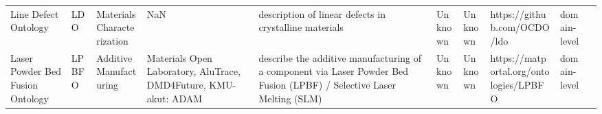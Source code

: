 \begin{tabular}{llllllllll}
                                                             Line Defect Ontology &                     LDO &                  Materials Characterization &                                                                                                                                                                                                                                                                                                                                                                  NaN &                                                                                                                                                                                                                                                                                                                                                 description of linear defects in crystalline materials &                                                                                                            Unknown &                                      Unknown &                                                                        https://github.com/OCDO/ldo &      domain-level \\
                                                 Laser Powder Bed Fusion Ontology &                   LPBFO &                      Additive Manufacturing &                                                                                                                                                                                                                                                                                                      Materials Open Laboratory, AluTrace, DMD4Future, KMU-akut: ADAM &                                                                                                                                                                                                                                                                                  describe the additive manufacturing of a component via Laser Powder Bed Fusion (LPBF) / Selective Laser Melting (SLM) &                                                                                                            Unknown &                                      Unknown &                                                             https://matportal.org/ontologies/LPBFO &      domain-level \\

\end{tabular}

